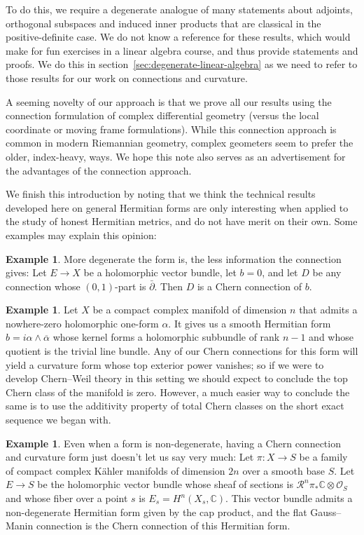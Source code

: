 \documentclass[10pt,a4paper]{amsart}
\theoremstyle{definition}
\newtheorem{exam}[theo]{Example}
\def\ov#1{\overline{#1}}
\begin{document}
To do this, we require a degenerate analogue of many statements about adjoints, orthogonal subspaces and induced inner products that are classical in the positive-definite case. We do not know a reference for these results, which would make for fun exercises in a linear algebra course, and thus provide statements and proofs. We do this in section~\ref{sec:degenerate-linear-algebra} as we need to refer to those results for our work on connections and curvature.

A seeming novelty of our approach is that we prove all our results using the connection formulation of complex differential geometry (versus the local coordinate or moving frame formulations). While this connection approach is common in modern Riemannian geometry, complex geometers seem to prefer the older, index-heavy, ways. We hope this note also serves as an advertisement for the advantages of the connection approach.



We finish this introduction by noting that we think the technical results developed here on general Hermitian forms are only interesting when applied to the study of honest Hermitian metrics, and do not have merit on their own.
Some examples may explain this opinion:


\begin{exam}
More degenerate the form is, the less information the connection gives:
Let $E \to X$ be a holomorphic vector bundle, let $b = 0$, and let $D$ be any connection whose $(0,1)$-part is $\bar\partial$. Then $D$ is a Chern connection of $b$.
\end{exam}


\begin{exam}
Let $X$ be a compact complex manifold of dimension $n$
that admits a nowhere-zero holomorphic one-form $\alpha$.
It  gives us a smooth Hermitian form $b = i \alpha \wedge \ov \alpha$ whose kernel forms a holomorphic subbundle of rank $n-1$ and whose quotient is the trivial line bundle.
Any of our Chern connections for this form will yield a curvature form whose top exterior power vanishes; so if we were to develop Chern--Weil theory in this setting we should expect to conclude the top Chern class of the manifold is zero.
However, a much easier way to conclude the same is to use the additivity property of total Chern classes on the short exact sequence we began with.
\end{exam}


\begin{exam}
Even when a form is non-degenerate, having a Chern connection and curvature form just doesn't let us say very much:
Let $\pi : X \to S$ be a family of compact complex K\"ahler manifolds of dimension $2n$ over a smooth base $S$.
Let $E \to S$ be the holomorphic vector bundle whose sheaf of sections is $\mathcal R^{n}\pi_{*}\mathbb C \otimes \mathcal O_{S}$ and whose fiber over a point $s$ is $E_{s} = H^{n}(X_{s}, \mathbb C)$.
This vector bundle admits a non-degenerate Hermitian form given by the cap product, and the flat Gauss--Manin connection is the Chern connection of this Hermitian form.
\end{exam}
\end{document}
